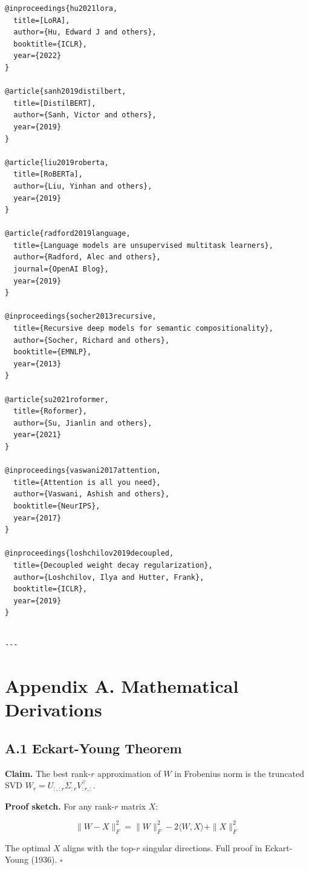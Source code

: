 \begin{lstlisting}
@inproceedings{hu2021lora,
  title=[LoRA],
  author={Hu, Edward J and others},
  booktitle={ICLR},
  year={2022}
}

@article{sanh2019distilbert,
  title=[DistilBERT],
  author={Sanh, Victor and others},
  year={2019}
}

@article{liu2019roberta,
  title=[RoBERTa],
  author={Liu, Yinhan and others},
  year={2019}
}

@article{radford2019language,
  title={Language models are unsupervised multitask learners},
  author={Radford, Alec and others},
  journal={OpenAI Blog},
  year={2019}
}

@inproceedings{socher2013recursive,
  title={Recursive deep models for semantic compositionality},
  author={Socher, Richard and others},
  booktitle={EMNLP},
  year={2013}
}

@article{su2021roformer,
  title={Roformer},
  author={Su, Jianlin and others},
  year={2021}
}

@inproceedings{vaswani2017attention,
  title={Attention is all you need},
  author={Vaswani, Ashish and others},
  booktitle={NeurIPS},
  year={2017}
}

@inproceedings{loshchilov2019decoupled,
  title={Decoupled weight decay regularization},
  author={Loshchilov, Ilya and Hutter, Frank},
  booktitle={ICLR},
  year={2019}
}
\end{lstlisting}
\begin{lstlisting}

---
\end{lstlisting}


\section{Appendix A. Mathematical Derivations}

\subsection{A.1 Eckart-Young Theorem}

\textbf{Claim.} The best rank-$r$ approximation of $W$ in Frobenius norm is the 
truncated SVD $W_r = U_{:, :r} \Sigma_{:r} V_{:r, :}^\top$.

\textbf{Proof sketch.} For any rank-$r$ matrix $X$:

\[
\|W - X\|_F^2 = \|W\|_F^2 - 2 \langle W, X \rangle + \|X\|_F^2
\]

The optimal $X$ aligns with the top-$r$ singular directions. Full proof in 
Eckart-Young (1936). $\square$

